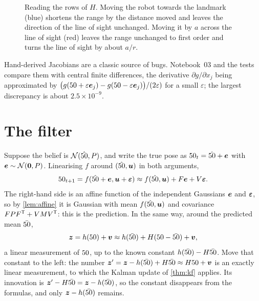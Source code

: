 \begin{figure}[ht]
\centering
{}
\caption{Reading the rows of $H$. Moving the robot towards the landmark
(blue) shortens the range by the distance moved and leaves the direction
of the line of sight unchanged. Moving it by $a$ across the line of sight
(red) leaves the range unchanged to first order and turns the line of
sight by about $a/r$.}
\label{fig:hgeom}
\end{figure}

Hand-derived Jacobians are a classic source of bugs. Notebook~03 and the
tests compare them with central finite differences, the derivative
$\partial g/\partial x_j$ being approximated by
$\bigl(g(50+\varepsilon\bm{e}_j)-g(50-\varepsilon\bm{e}_j)\bigr)/(2
\varepsilon)$ for a small $\varepsilon$; the largest discrepancy is about
$2.5\times10^{-9}$.

\section{The filter}

Suppose the belief is $\mathcal{N}(\hat{50},P)$, and write the true pose as
$50_t=\hat{50}+\bm{e}$ with $\bm{e}\sim\mathcal{N}(\bm{0},P)$. Linearising $f$
around $(\hat{50},\bm{u})$ in both arguments,
\[
  50_{t+1}=f(\hat{50}+\bm{e},\bm{u}+\bm{\varepsilon})\approx f(\hat{50},\bm{u})+F\bm{e}
  +V\bm{\varepsilon} .
\]
The right-hand side is an affine function of the independent Gaussians
$\bm{e}$ and $\bm{\varepsilon}$, so by \cref{lem:affine} it is Gaussian with mean
$f(\hat{50},\bm{u})$ and covariance $FPF^{\mathsf{T}}+VMV^{\mathsf{T}}$: this is the prediction. In the
same way, around the predicted mean $\bar{50}$,
\[
  \bm{z}=h(50)+\bm{v}\approx h(\bar{50})+H(50-\bar{50})+\bm{v},
\]
a linear measurement of $50$, up to the known constant $h(\bar{50})-H\bar{50}$.
Move that constant to the left: the number
$\bm{z}'=\bm{z}-h(\bar{50})+H\bar{50}\approx H50+\bm{v}$ is an exactly linear measurement, to
which the Kalman update of \cref{thm:kf} applies. Its innovation is
$\bm{z}'-H\bar{50}=\bm{z}-h(\bar{50})$, so the constant disappears from the formulas, and
only $\bm{z}-h(\bar{50})$ remains.

